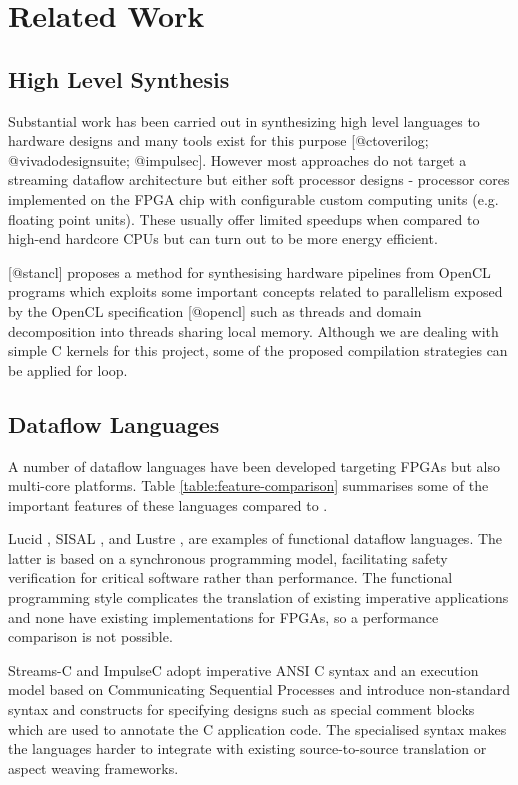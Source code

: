 \section{Related Work}

\subsection{High Level Synthesis}

Substantial work has been carried out in synthesizing high level
languages to hardware designs and many tools exist for this purpose
[@ctoverilog; @vivadodesignsuite; @impulsec]. However most approaches
do not target a streaming dataflow architecture but either soft
processor designs - processor cores implemented on the FPGA chip with
configurable custom computing units (e.g. floating point units). These
usually offer limited speedups when compared to high-end hardcore
CPUs but can turn out to be more energy efficient.


[@stancl] proposes a method for synthesising hardware pipelines from
OpenCL programs which exploits some important concepts related to
parallelism exposed by the OpenCL specification [@opencl] such as
threads and domain decomposition into threads sharing local memory.
Although we are dealing with simple C kernels for this project, some
of the proposed compilation strategies can be applied for
loop.

\subsection{Dataflow Languages}
A number of dataflow languages have been developed targeting FPGAs but
also multi-core platforms. Table \ref{table:feature-comparison}
summarises some of the important features of these languages compared
to \FAST{}.

Lucid \cite{ashcroft1977lucid}, SISAL \cite{gurd1987implicit},
\cite{mcgraw1983sisal} and Lustre \cite{halbwachs1991synchronous}, are
examples of functional dataflow languages. The latter is based on a
synchronous programming model, facilitating safety verification for
critical software \cite{halbwachs1992programming} rather than
performance. The functional programming style complicates the
translation of existing imperative applications and none have existing
implementations for FPGAs, so a performance comparison is not
possible.

Streams-C\cite{Gokhale:Stone:Arnold:Kalinowski:2000} and
ImpulseC\cite{ImpulseC} adopt imperative ANSI C syntax and an
execution model based on Communicating Sequential Processes and
introduce non-standard syntax and constructs for specifying designs
such as special comment blocks which are used to annotate the C
application code. The specialised syntax makes the languages harder to
integrate with existing source-to-source translation or aspect weaving
frameworks.

